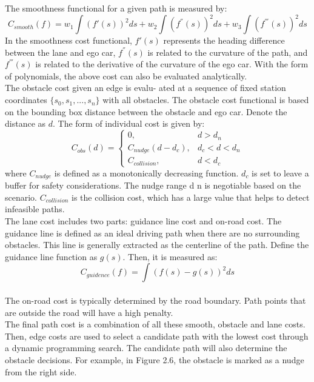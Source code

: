 \documentclass{report}
\begin{document}
\indent
The smoothness functional for a given path is measured by:
\begin{equation}
C_{smooth}(f) = w_1 \int (f'(s))^2 ds + w_2 \int (f^{''}(s))^2 ds + w_3 \int (f^{'''}(s))^2 ds
\end{equation}
In the smoothness cost functional, $f'(s)$ represents the heading difference between the lane and ego car, $f^{''}(s)$ is related to the curvature of the path, and $f^{'''}(s)$ is related to the derivative of the curvature of the ego car. With the form of polynomials, the above cost can also be evaluated analytically. \\
\indent
The obstacle cost given an edge is evalu-
ated at a sequence of fixed station coordinates $\{s_0 , s_1 , ..., s_n \}$ with all obstacles. The obstacle cost functional is based on the bounding box distance between the obstacle and ego car. Denote the distance as $d$. The form of individual cost is given
by:
\begin{equation}
C_{obs}(d) = 
\begin{cases}
0, & d > d_n\\
C_{nudge}(d - d_c), & d_c < d < d_n\\
C_{collision}, & d< d_c
\end{cases}
\end{equation}
where $C_{nudge}$ is defined as a monotonically decreasing function. $d_c$ is set to leave a buffer for safety considerations. The nudge range d n is negotiable based on the scenario. $C_{collision}$ is the collision cost, which has a large value that helps to detect infeasible paths.\\
\indent
The lane cost includes two parts: guidance line cost and on-road cost. The guidance line is defined as an ideal driving path when there are no surrounding obstacles. This line is generally extracted as the centerline of the path. Define the guidance line function as $g(s)$. Then, it is measured as:
\begin{equation}
C_{guidence}(f) = \int (f(s)-g(s))^2 ds
\end{equation}\\
\indent
The on-road cost is typically determined by the road boundary. Path points that are outside the road will have a high penalty.\\
\indent
The final path cost is a combination of all these smooth, obstacle and lane costs. Then, edge costs are used to select a candidate path with the lowest cost through a dynamic programming search. The candidate path will also determine the obstacle decisions. For example, in Figure 2.6, the obstacle is marked as a nudge from the right side.
\end{document}
